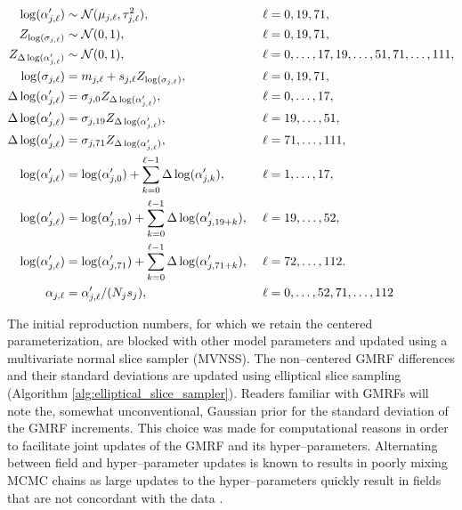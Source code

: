 \begin{footnotesize}
	\begin{align}
	\log(\alpha^\prime_{j,\ell}) &\sim \mcN(\mu_{j,\ell},\tau_{j,\ell}^2),&\ &\ell= 0,19,71, \nonumber\\
	Z_{\log(\sigma_{j,\ell})} &\sim \mcN(0,1),&\ &\ell=0,19,71, \nonumber \\
	Z_{\Delta\log(\alpha^\prime_{j,\ell})} &\sim \mcN(0,1),&\ &\ell=0,\dots,17,19,\dots,51,71,\dots,111, \nonumber \\ 
	\log(\sigma_{j,\ell}) &= m_{j,\ell} + s_{j,\ell}Z_{\log(\sigma_{j,\ell})},&\ &\ell = 0,19,71,\nonumber\\
	\Delta\log(\alpha^\prime_{j,\ell})&= \sigma_{j,0} Z_{\Delta\log(\alpha^\prime_{j,\ell})},&\ &\ell=0,\dots,17, \nonumber\\
	\Delta\log(\alpha^\prime_{j,\ell})&= \sigma_{j,19} Z_{\Delta\log(\alpha^\prime_{j,\ell})},&\ &\ell=19,\dots,51, \nonumber\\
	\Delta\log(\alpha^\prime_{j,\ell})&= \sigma_{j,71} Z_{\Delta\log(\alpha^\prime_{j,\ell})},&\ &\ell=71,\dots,111, \nonumber\\
	\log(\alpha^\prime_{j,\ell}) &= \log(\alpha^\prime_{j,0}) + \sum_{k=0}^{\ell-1}\Delta\log(\alpha^\prime_{j,k}),&\ &\ell = 1,\dots,17, \nonumber\\
	\log(\alpha^\prime_{j,\ell}) &= \log(\alpha^\prime_{j,19}) + \sum_{k=0}^{\ell-1}\Delta\log(\alpha^\prime_{j,19+k}),&\ &\ell = 19,\dots,52, \nonumber\\
	\log(\alpha^\prime_{j,\ell}) &= \log(\alpha^\prime_{j,71}) + \sum_{k=0}^{\ell-1}\Delta\log(\alpha^\prime_{j,71+k}),&\ &\ell = 72,\dots,112. \nonumber \\
	\alpha_{j,\ell} &= \alpha^\prime_{j,\ell}/(N_js_j),&\ &\ell=0,\dots,52,71,\dots,112 \nonumber
	\end{align}
\end{footnotesize}
The initial reproduction numbers, for which we retain the centered parameterization, are blocked with other model parameters and updated using a multivariate normal slice sampler (MVNSS). The non--centered GMRF differences and their standard deviations are updated 
using elliptical slice sampling (Algorithm \ref{alg:elliptical_slice_sampler}).
Readers familiar with GMRFs will note the, somewhat unconventional, Gaussian prior for the standard deviation of the GMRF increments. This choice was made for computational reasons in order to facilitate joint updates of the GMRF and its hyper--parameters. Alternating between field and hyper--parameter updates is known to results in poorly mixing MCMC chains as large updates to the hyper--parameters quickly result in fields that are not concordant with the data  \cite{knorr2002block,murray2010hyper}. 

